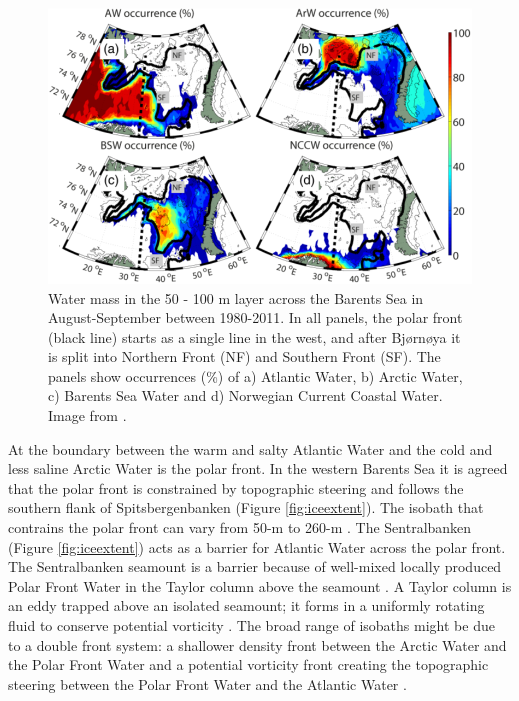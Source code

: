 \documentclass[a4paper, 12pt, Ariel]{article}
\begin{document}
\begin{figure}[H]
	\includegraphics[width=\textwidth]{OzielWaterMass.png}
	\caption{Water mass in the 50 - 100 m layer across the Barents Sea in August-September between 1980-2011. In all panels, the polar front (black line) starts as a single line in the west, and after Bjørnøya it is split into Northern Front (NF) and Southern Front (SF). The panels show occurrences (\%) of a) Atlantic Water, b) Arctic Water, c) Barents Sea Water and d) Norwegian Current Coastal Water. Image from \cite{Oziel2016}.}
	\label{fig:polarfront}
\end{figure}


At the boundary between the warm and salty Atlantic Water and the cold and less saline Arctic Water is the polar front. In the western Barents Sea it is agreed that the polar front is constrained by topographic steering and follows the southern flank of Spitsbergenbanken (Figure \ref{fig:iceextent}). The isobath that contrains the polar front can vary from 50-m to 260-m \cite{Parsons1996, Vaage2014, Oziel2016}. The Sentralbanken (Figure \ref{fig:iceextent}) acts as a barrier for Atlantic Water across the polar front. The Sentralbanken seamount is a barrier because of well-mixed locally produced Polar Front Water in the Taylor column above the seamount \cite{Reigstad2002}. A Taylor column is an eddy trapped above an isolated seamount; it forms in a uniformly rotating fluid to conserve potential vorticity \cite{Chapman1992}. The broad range of isobaths might be due to a double front system: a shallower density front between the Arctic Water and the Polar Front Water and a potential vorticity front creating the topographic steering between the Polar Front Water and the Atlantic Water \cite{Hop2020}.\\
\end{document}
